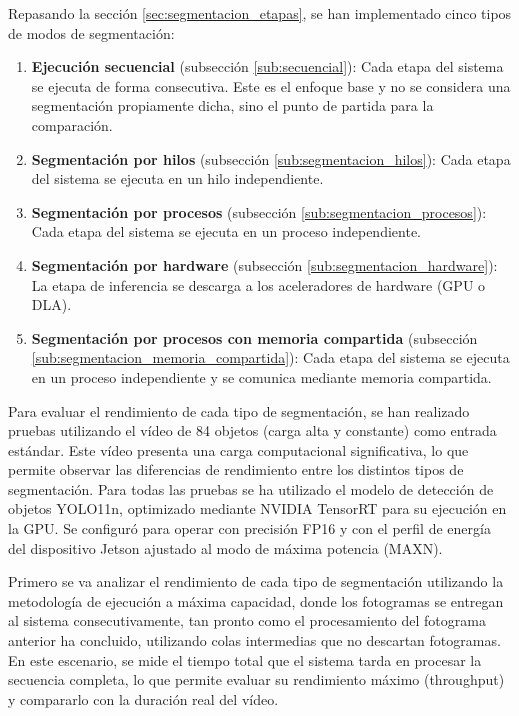 \documentclass[11pt,spanish,listoffigures,listoftables]{tfgetsinf}
\begin{document}
Repasando la sección \ref{sec:segmentacion_etapas}, se han implementado cinco tipos de modos de segmentación:
\begin{enumerate}
   \item \textbf{Ejecución secuencial} (subsección \ref{sub:secuencial}): Cada etapa del sistema se ejecuta de forma consecutiva. Este es el enfoque base y no se considera una segmentación propiamente dicha, sino el punto de partida para la comparación.
   \item \textbf{Segmentación por hilos} (subsección \ref{sub:segmentacion_hilos}): Cada etapa del sistema se ejecuta en un hilo independiente.
   \item \textbf{Segmentación por procesos} (subsección \ref{sub:segmentacion_procesos}): Cada etapa del sistema se ejecuta en un proceso independiente.
   \item \textbf{Segmentación por hardware} (subsección \ref{sub:segmentacion_hardware}): La etapa de inferencia se descarga a los aceleradores de hardware (GPU o DLA).
   \item \textbf{Segmentación por procesos con memoria compartida} (subsección \ref{sub:segmentacion_memoria_compartida}): Cada etapa del sistema se ejecuta en un proceso independiente y se comunica mediante memoria compartida.
\end{enumerate}

Para evaluar el rendimiento de cada tipo de segmentación, se han realizado pruebas utilizando el vídeo de 84 objetos (carga alta y constante) como entrada estándar. Este vídeo presenta una carga computacional significativa, lo que permite observar las diferencias de rendimiento entre los distintos tipos de segmentación. Para todas las pruebas se ha utilizado el modelo de detección de objetos YOLO11n, optimizado mediante NVIDIA TensorRT para su ejecución en la GPU. Se configuró para operar con precisión FP16 y con el perfil de energía del dispositivo Jetson ajustado al modo de máxima potencia (MAXN). 


Primero se va analizar el rendimiento de cada tipo de segmentación utilizando la metodología de ejecución a máxima capacidad, donde los fotogramas se entregan al sistema consecutivamente, tan pronto como el procesamiento del fotograma anterior ha concluido, utilizando colas intermedias que no descartan fotogramas. En este escenario, se mide el tiempo total que el sistema tarda en procesar la secuencia completa, lo que permite evaluar su rendimiento máximo (throughput) y compararlo con la duración real del vídeo.
\end{document}
